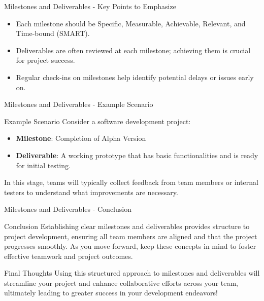 \documentclass[aspectratio=169]{beamer}
\begin{document}
\begin{frame}[fragile]{Milestones and Deliverables - Key Points to Emphasize}
  \begin{itemize}
    \item Each milestone should be Specific, Measurable, Achievable, Relevant, and Time-bound (SMART).
    \item Deliverables are often reviewed at each milestone; achieving them is crucial for project success.
    \item Regular check-ins on milestones help identify potential delays or issues early on.
  \end{itemize}
\end{frame}

\begin{frame}[fragile]{Milestones and Deliverables - Example Scenario}
  \begin{block}{Example Scenario}
    Consider a software development project:
    \begin{itemize}
      \item \textbf{Milestone}: Completion of Alpha Version
      \item \textbf{Deliverable}: A working prototype that has basic functionalities and is ready for initial testing.
    \end{itemize}
    In this stage, teams will typically collect feedback from team members or internal testers to understand what improvements are necessary.
  \end{block}
\end{frame}

\begin{frame}[fragile]{Milestones and Deliverables - Conclusion}
  \begin{block}{Conclusion}
    Establishing clear milestones and deliverables provides structure to project development, ensuring all team members are aligned and that the project progresses smoothly. As you move forward, keep these concepts in mind to foster effective teamwork and project outcomes.
  \end{block}
  
  \begin{block}{Final Thoughts}
    Using this structured approach to milestones and deliverables will streamline your project and enhance collaborative efforts across your team, ultimately leading to greater success in your development endeavors!
  \end{block}
\end{frame}
\end{document}
